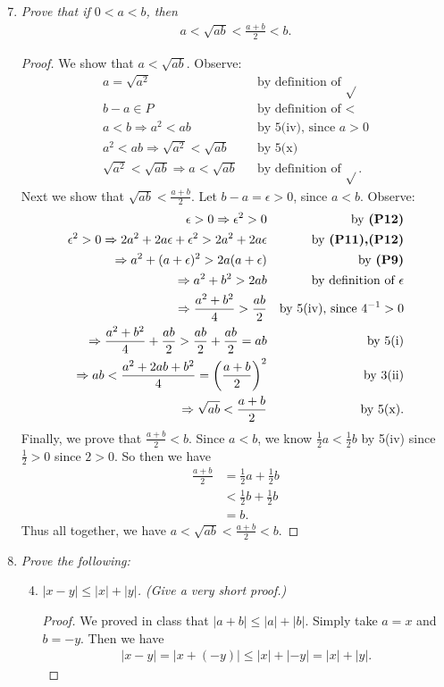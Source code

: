 \documentclass[12pt]{amsbook}
\theoremstyle{plain}
\numberwithin{section}{chapter}
\numberwithin{equation}{chapter}
\theoremstyle{definition}
\theoremstyle{remark}
\theoremstyle{plain}
\newcommand{\bee}{\begin{equation}\begin{aligned}}
\newcommand{\eee}{\end{aligned}\end{equation}}
\newcommand{\fracc}{\frac}
\newcommand{\lpar}{\left(}
\newcommand{\rpar}{\right)}
\newcommand{\qwe}{\sqrt}
\renewcommand{\leq}{\leqslant}
\begin{document}
\begin{enumerate}[label=\roman*)]
\setcounter{enumi}{6}
\item \textit{Prove that if $0 < a < b$, then}
\bee
a < \qwe{ab} < \fracc{a + b}{2} < b. 
\eee
\begin{proof}
We show that $a < \qwe{ab}$. Observe:
\bee
a = \qwe{a^2} && \text{by definition of $\qwe{  }$}\\
b - a \in P && \text{by definition of $<$}\\
a < b \Rightarrow a^2 < ab && \text{by 5(iv), since $a > 0$}\\
a^2 < ab \Rightarrow \qwe{a^2} < \qwe{ab} && \text{by 5(x)}\\
\qwe{a^2} < \qwe{ab} \Rightarrow a < \qwe{ab} && \text{by definition of }\qwe{ }.
\eee
Next we show that $\qwe{ab} < \fracc{a + b}{2}$. Let $b - a = \epsilon > 0$, since $a < b$. Observe:
\bee
\epsilon > 0 \Rightarrow \epsilon^2 > 0 && \text{by \textbf{(P12)}}\\
\epsilon^2 > 0 \Rightarrow 2a^2 + 2a\epsilon + \epsilon^2 > 2a^2 + 2a\epsilon && \text{by \textbf{(P11),(P12)}}\\
\Rightarrow a^2 + (a + \epsilon)^2 > 2a(a + \epsilon) && \text{by \textbf{(P9)}}\\
\Rightarrow a^2 + b^2 > 2ab && \text{by definition of }\epsilon\\
\Rightarrow \fracc{a^2 + b^2}{4} > \fracc{ab}{2} && \text{by 5(iv), since }4^{-1} > 0\\
\Rightarrow \fracc{a^2 + b^2}{4} + \fracc{ab}{2} > \fracc{ab}{2} + \fracc{ab}{2} = ab && \text{by 5(i)}\\
\Rightarrow ab < \fracc{a^2 + 2ab + b^2}{4} = \lpar \fracc{a + b}{2} \rpar^2 && \text{by 3(ii)}\\
\Rightarrow \qwe{ab} < \fracc{a + b}{2} && \text{by 5(x)}.
\eee
Finally, we prove that $\fracc{a + b}{2} < b$. 
Since $a < b$, we know $\fracc{1}{2}a < \fracc{1}{2}b$ by 5(iv) since $\fracc{1}{2} > 0$ since $2 > 0$. So then we have
\bee
\fracc{a + b}{2} &= \fracc{1}{2}a + \fracc{1}{2}b\\
&< \fracc{1}{2}b + \fracc{1}{2}b\\
&= b. 
\eee
Thus all together, we have $a < \qwe{ab} < \fracc{a + b}{2} < b$. 
\end{proof}
\setcounter{enumi}{11}
\item \textit{Prove the following: }
\begin{enumerate}[label=(\roman*)]
\setcounter{enumii}{3}
\item \textit{$|x - y| \leq |x| + |y|$. (Give a very short proof.)}
\begin{proof}
We proved in class that $|a + b| \leq |a| + |b|$. Simply take $a = x$ and $b = -y$. Then we have
\bee
 |x - y| = |x + (-y)| \leq |x| + |-y| = |x| + |y|. 
\eee


\end{proof}
\end{enumerate}
\end{enumerate}
\end{document}
